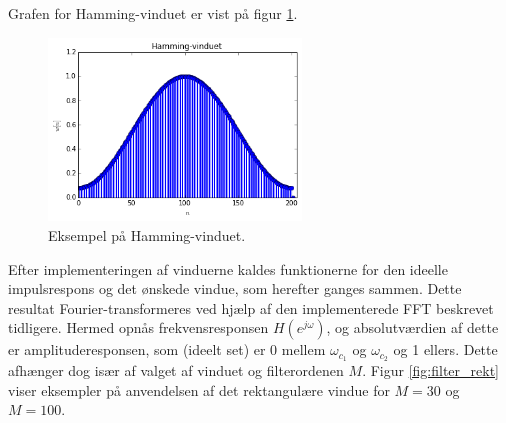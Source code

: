 Grafen for Hamming-vinduet er vist på figur \ref{fig:Hamming}.
\begin{figure}[H]
    \centering
    \includegraphics[width = 0.6\textwidth]{figures/Hamming-vindue.PNG}
    \caption{Eksempel på Hamming-vinduet.}
    \label{fig:Hamming}
\end{figure}
Efter implementeringen af vinduerne kaldes funktionerne for den ideelle impulsrespons og det ønskede vindue, som herefter ganges sammen. Dette resultat Fourier-transformeres ved hjælp af den implementerede FFT beskrevet tidligere. Hermed opnås frekvensresponsen $H(e^{j\omega})$, og absolutværdien af dette er amplituderesponsen, som (ideelt set) er 0 mellem $\omega_{c_1}$ og $\omega_{c_2}$ og 1 ellers. Dette afhænger dog især af valget af vinduet og filterordenen $M$. Figur \ref{fig:filter_rekt} viser eksempler på anvendelsen af det rektangulære vindue for $M = 30$ og $M = 100$.

